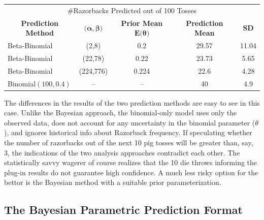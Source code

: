 \documentclass[12pt, a4paper]{article}
\begin{document}
\vspace{1cm}

\begin{center}
  \begin{tabular}{l c c c c }
  \toprule
  \multicolumn{5}{c}{\large \#Razorbacks Predicted out of 100 Tosses}          \\
  \multicolumn{1}{c}{\textbf{Prediction Method}} & \multicolumn{1}{c}{$\textbf{(}\boldsymbol\alpha,\boldsymbol\beta\textbf{)}$}  & \multicolumn{1}{c}{\textbf{Prior Mean }$\textbf{E(}\boldsymbol\theta\textbf{)}$}  & \multicolumn{1}{c}{\textbf{Prediction Mean}} & \multicolumn{1}{c}{\textbf{SD}}\\
        \midrule
        Beta-Binomial & (2,8) & 0.2 & 29.57 & 11.04 \\
        \midrule
        Beta-Binomial & (22,78) & 0.22 & 23.73 & 5.65\\
        \midrule
        Beta-Binomial & (224,776) & 0.224 & 22.6 & 4.28 \\
        \midrule
        Binomial$(100,0.4)$ & -- & -- & 40 & 4.9 \\
  \bottomrule
  \end{tabular}
\end{center}

\vspace{1cm}

\noindent The differences in the results of the two prediction methods are easy to see in this case. Unlike the Bayesian approach, the binomial-only model uses only the observed data, does not account for any uncertainty in the binomial parameter ($\theta$), and ignores historical info about Razorback frequency.  If speculating whether the number of razorbacks out of the next 10 pig tosses will be greater than, say, 3, the indications of the two analysis approaches contradict each other.  The statistically savvy wagerer of course realizes that the 10 die throws informing the plug-in results do not guarantee high confidence.  A much less risky option for the bettor is the Bayesian method with a suitable prior parameterization.


\clearpage

  \subsection{The Bayesian Parametric Prediction Format}
\end{document}
